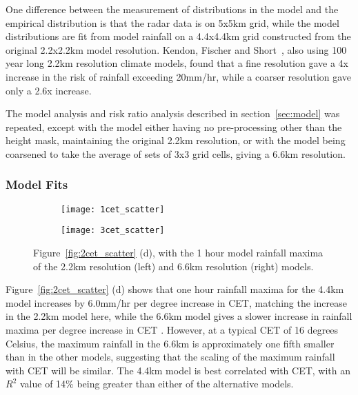 One difference between the measurement of distributions in the model and the empirical distribution is that the radar data is on 5x5km grid,
    while the model distributions are fit from model rainfall on a 4.4x4.4km grid constructed from the original 2.2x2.2km model resolution.
Kendon, Fischer and Short~\cite{Kendon_Fischer_Short_2023}, also using 100 year long 2.2km resolution climate models,
    found that a fine resolution gave a 4x increase in the risk of rainfall exceeding 20mm/hr,
    while a coarser resolution gave only a 2.6x increase.

The model analysis and risk ratio analysis described in section~\ref{sec:model} was repeated,
    except with the model either having no pre-processing other than the height mask,
    maintaining the original 2.2km resolution,
    or with the model being coarsened to take the average of sets of 3x3 grid cells,
    giving a 6.6km resolution.

\subsubsection{Model Fits}

\begin{figure}[H]
    \centering
    \begin{subfigure}{0.48\textwidth}
        \centering
        \texttt{[image: 1cet\_scatter]}
    \end{subfigure}
    \hfill
    \begin{subfigure}{0.48\textwidth}
        \centering
        \texttt{[image: 3cet\_scatter]}
    \end{subfigure}
    \caption{Figure~\ref{fig:2cet_scatter} (d), with the 1 hour model rainfall maxima of the 2.2km resolution (left) and 6.6km resolution (right) models.}
    \label{fig:13cet_scatter}
\end{figure}

Figure~\ref{fig:2cet_scatter} (d) shows that
    one hour rainfall maxima for the 4.4km model increases by 6.0mm/hr per degree increase in CET,
    matching the increase in the 2.2km model here,
    while the 6.6km model gives a slower increase in rainfall maxima per degree increase in CET .
However, at a typical CET of 16 degrees Celsius,
    the maximum rainfall in the 6.6km is approximately one fifth smaller than in the other models,
    suggesting that the scaling of the maximum rainfall with CET will be similar.
The 4.4km model is best correlated with CET, with an $R^2$ value of 14\% being greater than either of the alternative models.

